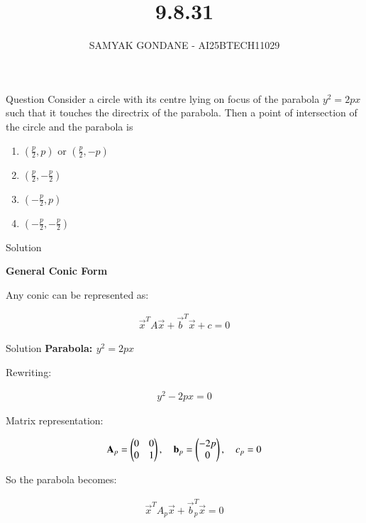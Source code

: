 \documentclass{beamer}
\title 
{9.8.31}
\date{}
\author
{SAMYAK GONDANE - AI25BTECH11029}
\begin{document}
\frame{\titlepage}

\begin{frame}{Question}
Consider a circle with its centre lying on focus of the parabola $y^2 = 2px$ such that it touches the directrix of the parabola. Then a point of intersection of the circle and the parabola is

\begin{multicols}{2}
\begin{enumerate}
    \item $(\frac{p}{2}, p)$ or $(\frac{p}{2}, -p)$
    \item $(\frac{p}{2}, -\frac{p}{2})$
    \item $(-\frac{p}{2}, p)$
    \item $(-\frac{p}{2}, -\frac{p}{2})$
\end{enumerate}
\end{multicols}

\end{frame}

\begin{frame}{Solution}


\textbf{General Conic Form}

Any conic can be represented as:


\begin{align}
\vec{x}^T A \vec{x} + \vec{b}^T \vec{x} + c = 0
\end{align}
\end{frame}


\begin{frame}{Solution}
\textbf{Parabola: $y^2 = 2px$}

Rewriting:


\begin{align}
y^2 - 2px = 0
\end{align}


Matrix representation:

\begin{align}
\mathbf{A}_p = \begin{pmatrix}0 & 0 \\ 0 & 1\end{pmatrix}, \quad
\mathbf{b}_p = \begin{pmatrix}-2p \\ 0\end{pmatrix}, \quad
c_p = 0
\end{align}



So the parabola becomes:


\begin{align}
\vec{x}^T A_p \vec{x} + \vec{b}_p^T \vec{x} = 0
\end{align}
\end{frame}
\end{document}
